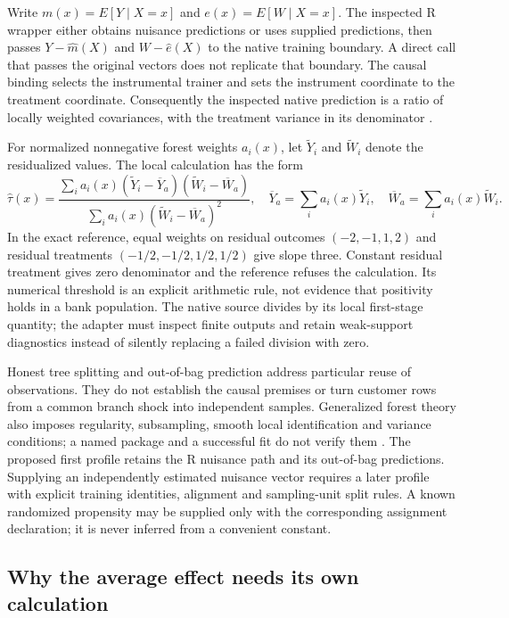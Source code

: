 Write \(m(x)=E[Y\mid X=x]\) and \(e(x)=E[W\mid X=x]\). The inspected R
wrapper either obtains nuisance predictions or uses supplied
predictions, then passes \(Y-\widehat m(X)\) and \(W-\widehat e(X)\) to
the native training boundary. A direct call that passes the original
vectors does not replicate that boundary. The causal binding selects the
instrumental trainer and sets the instrument coordinate to the treatment
coordinate. Consequently the inspected native prediction is a ratio of
locally weighted covariances, with the treatment variance in its
denominator \cite{exec13_grf_rpath,exec13_grf_native}.

For normalized nonnegative forest weights \(a_i(x)\), let
\(\widetilde Y_i\) and \(\widetilde W_i\) denote the residualized
values. The local calculation has the form \[
 \widehat\tau(x)=
 \frac{\sum_i a_i(x)(\widetilde Y_i-\overline Y_a)
                         (\widetilde W_i-\overline W_a)}
      {\sum_i a_i(x)(\widetilde W_i-\overline W_a)^2},
 \quad
 \overline Y_a=\sum_i a_i(x)\widetilde Y_i,
 \quad \overline W_a=\sum_i a_i(x)\widetilde W_i.
\] In the exact reference, equal weights on residual outcomes
\((-2,-1,1,2)\) and residual treatments \((-1/2,-1/2,1/2,1/2)\) give
slope three. Constant residual treatment gives zero denominator and the
reference refuses the calculation. Its numerical threshold is an
explicit arithmetic rule, not evidence that positivity holds in a bank
population. The native source divides by its local first-stage quantity;
the adapter must inspect finite outputs and retain weak-support
diagnostics instead of silently replacing a failed division with zero.

Honest tree splitting and out-of-bag prediction address particular reuse
of observations. They do not establish the causal premises or turn
customer rows from a common branch shock into independent samples.
Generalized forest theory also imposes regularity, subsampling, smooth
local identification and variance conditions; a named package and a
successful fit do not verify them \cite{grf2018}. The proposed first
profile retains the R nuisance path and its out-of-bag predictions.
Supplying an independently estimated nuisance vector requires a later
profile with explicit training identities, alignment and sampling-unit
split rules. A known randomized propensity may be supplied only with the
corresponding assignment declaration; it is never inferred from a
convenient constant.

\subsection{Why the average effect needs its own calculation}


